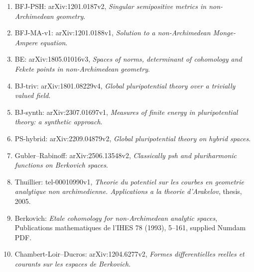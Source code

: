 \documentclass[
  11pt,
]{article}
\providecommand{\tightlist}{%
  \setlength{\itemsep}{0pt}\setlength{\parskip}{0pt}}
\begin{document}
\begin{enumerate}
\def\labelenumi{\arabic{enumi}.}
\tightlist
\item
  BFJ-PSH: arXiv:1201.0187v2, \emph{Singular semipositive metrics in
  non-Archimedean geometry}.
\item
  BFJ-MA-v1: arXiv:1201.0188v1, \emph{Solution to a non-Archimedean
  Monge-Ampere equation}.
\item
  BE: arXiv:1805.01016v3, \emph{Spaces of norms, determinant of
  cohomology and Fekete points in non-Archimedean geometry}.
\item
  BJ-triv: arXiv:1801.08229v4, \emph{Global pluripotential theory over a
  trivially valued field}.
\item
  BJ-synth: arXiv:2307.01697v1, \emph{Measures of finite energy in
  pluripotential theory: a synthetic approach}.
\item
  PS-hybrid: arXiv:2209.04879v2, \emph{Global pluripotential theory on
  hybrid spaces}.
\item
  Gubler--Rabinoff: arXiv:2506.13548v2, \emph{Classically psh and
  pluriharmonic functions on Berkovich spaces}.
\item
  Thuillier: tel-00010990v1, \emph{Theorie du potentiel sur les courbes
  en geometrie analytique non archimedienne. Applications a la theorie
  d'Arakelov}, thesis, 2005.
\item
  Berkovich: \emph{Etale cohomology for non-Archimedean analytic
  spaces}, Publications mathematiques de l'IHES 78 (1993), 5--161,
  supplied Numdam PDF.
\item
  Chambert-Loir--Ducros: arXiv:1204.6277v2, \emph{Formes differentielles
  reelles et courants sur les espaces de Berkovich}.
\end{enumerate}
\end{document}
